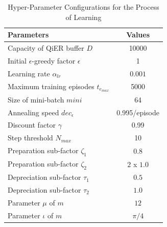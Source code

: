 \documentclass[journal]{IEEEtran}
\begin{document}
\begin{table}[h]
    \centering
    \caption{Hyper-Parameter Configurations for the Process of Learning}
    \label{hypertable}
    \begin{tabular}{|l|c|}
        \hline
        \textbf{Parameters} & \textbf{Values} \\
        \hline
        Capacity of QiER buffer $D$ & 10000 \\
        Initial $\epsilon$-greedy factor $\epsilon$ & 1 \\
        Learning rate $\alpha_{lr}$ & $0.001$ \\
        Maximum training episodes $t_{e_{max}}$ & 5000 \\
        Size of mini-batch $mini$ & 64 \\
        Annealing speed $dec_\epsilon$ & 0.995/episode \\
        Discount factor $\gamma$ & 0.99 \\
        Step threshold $N_{max}$ & 10 \\
        Preparation sub-factor $\zeta_{1}$ \cite{9357477} &  $0.8$  \\
        Preparation sub-factor $\zeta_{2}$ & $2$ x $1.0$ \\
        Depreciation sub-factor $\tau_{1}$ \cite{9357477} & $0.5$ \\
        Depreciation sub-factor $\tau_{2}$ & $1.0$ \\
        Parameter $\mu$ of $m$ & $12$\\
        Parameter $\iota$ of $m$ \cite{9357477}& $\pi /4$ \\
        \hline
    \end{tabular}
\end{table}
\end{document}
